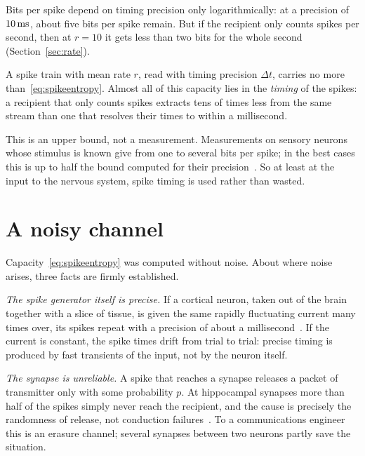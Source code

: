 Bits per spike depend on timing precision only logarithmically: at a precision of $10\,\text{ms}$, about five bits per spike remain. But if the recipient only counts spikes per second, then at $r=10$ it gets less than two bits for the whole second (Section~\ref{sec:rate}).

\begin{keyblock}
\begin{proposition}
\label{prop:capacity}
A spike train with mean rate $r$, read with timing precision $\Delta t$, carries no more than~\eqref{eq:spikeentropy}. Almost all of this capacity lies in the \emph{timing} of the spikes: a recipient that only counts spikes extracts tens of times less from the same stream than one that resolves their times to within a millisecond.
\end{proposition}
\end{keyblock}

This is an upper bound, not a measurement. Measurements on sensory neurons whose stimulus is known give from one to several bits per spike; in the best cases this is up to half the bound computed for their precision~\cite{Rieke1997}. So at least at the input to the nervous system, spike timing is used rather than wasted.

\section{A noisy channel}

Capacity~\eqref{eq:spikeentropy} was computed without noise. About where noise arises, three facts are firmly established.

\emph{The spike generator itself is precise.} If a cortical neuron, taken out of the brain together with a slice of tissue, is given the same rapidly fluctuating current many times over, its spikes repeat with a precision of about a millisecond~\cite{Mainen1995}. If the current is constant, the spike times drift from trial to trial: precise timing is produced by fast transients of the input, not by the neuron itself.

\emph{The synapse is unreliable.} A spike that reaches a  synapse releases a packet of transmitter only with some probability $p$. At hippocampal synapses more than half of the spikes simply never reach the recipient, and the cause is precisely the randomness of release, not conduction failures~\cite{AllenStevens1994}. To a communications engineer this is an erasure channel; several synapses between two neurons partly save the situation.

